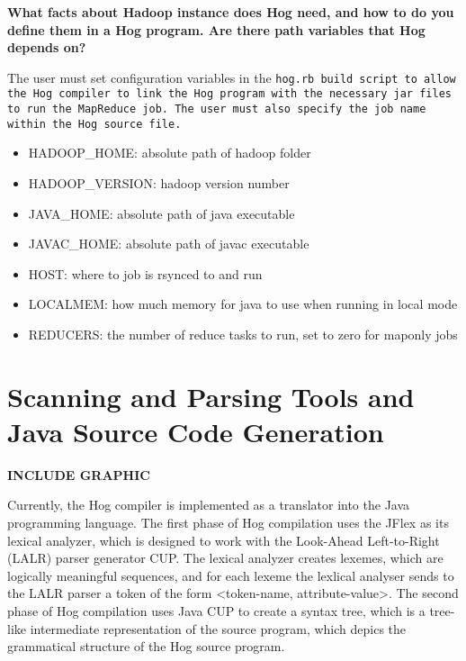 \documentclass{book}
\begin{document}
\textbf{What facts about Hadoop instance does Hog need, and how to do you define
them in a Hog program. Are there path variables that Hog depends on?}

The user must set configuration variables in the \tt hog.rb \rm build script to
allow the Hog compiler to link the Hog program with the necessary jar files to run
the MapReduce job. The user must also specify the job name within the Hog source
file.

\begin{itemize}

\item[] HADOOP\_HOME: absolute path of hadoop folder
\item[] HADOOP\_VERSION: hadoop version number
\item[] JAVA\_HOME: absolute path of java executable
\item[] JAVAC\_HOME: absolute path of javac executable
\item[] HOST: where to job is rsynced to and run
\item[] LOCALMEM: how much memory for java to use when running in local mode 
\item[] REDUCERS: the number of reduce tasks to run, set to zero for map­only jobs

\end{itemize}


\chapter{Scanning and Parsing Tools and Java Source Code Generation} %
\label{cha:parsing_tools}

\textbf{INCLUDE GRAPHIC}

Currently, the Hog compiler is implemented as a translator into the Java programming 
language. The first phase of Hog compilation uses the JFlex as its lexical analyzer,
which is designed to work with the Look-Ahead Left-to-Right (LALR) parser generator
CUP. The lexical analyzer creates lexemes, which are logically meaningful sequences,
and for each lexeme the lexlical analyser sends to the LALR parser a token of the
form <token-name, attribute-value>. The second phase of Hog compilation uses Java CUP
to create a syntax tree, which is a tree-like intermediate representation of the source
program, which depics the grammatical structure of the Hog source program.
\end{document}
